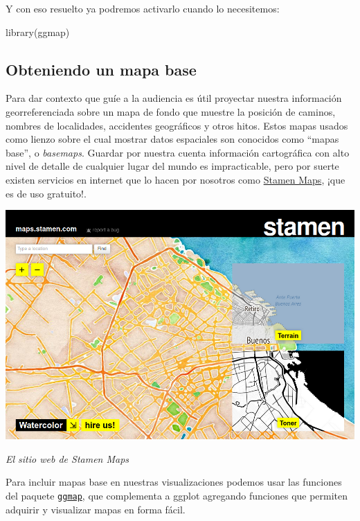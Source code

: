 \documentclass[
]{book}
\newenvironment{Shaded}{\begin{snugshade}}{\end{snugshade}}
\newcommand{\FunctionTok}[1]{\textcolor[rgb]{0.00,0.00,0.00}{#1}}
\newcommand{\NormalTok}[1]{#1}
\begin{document}
Y con eso resuelto ya podremos activarlo cuando lo necesitemos:

\begin{Shaded}
\begin{Highlighting}[]
\FunctionTok{library}\NormalTok{(ggmap)}
\end{Highlighting}
\end{Shaded}

\hypertarget{obteniendo-un-mapa-base}{%
\subsection{Obteniendo un mapa base}\label{obteniendo-un-mapa-base}}

Para dar contexto que guíe a la audiencia es útil proyectar nuestra información georreferenciada sobre un mapa de fondo que muestre la posición de caminos, nombres de localidades, accidentes geográficos y otros hitos. Estos mapas usados como lienzo sobre el cual mostrar datos espaciales son conocidos como ``mapas base'', o \emph{basemaps}. Guardar por nuestra cuenta información cartográfica con alto nivel de detalle de cualquier lugar del mundo es impracticable, pero por suerte existen servicios en internet que lo hacen por nosotros como \href{http://maps.stamen.com}{Stamen Maps}, ¡que es de uso gratuito!.

\begin{center}\includegraphics[width=0.85\linewidth]{imagenes/stamen} \end{center}

\emph{El sitio web de Stamen Maps}

Para incluir mapas base en nuestras visualizaciones podemos usar las funciones del paquete \href{https://github.com/dkahle/ggmap}{\texttt{ggmap}}, que complementa a ggplot agregando funciones que permiten adquirir y visualizar mapas en forma fácil.
\end{document}
